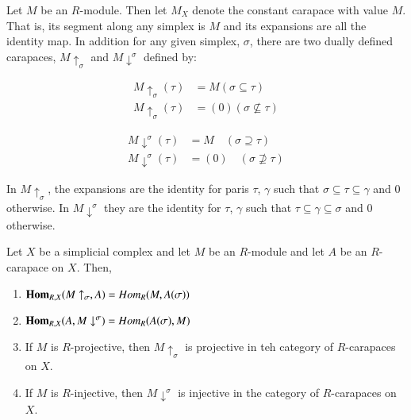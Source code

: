 Let $M$ be an $R$-module. Then let $M_{X}$ denote the constant carapace with value $M$. That is, its segment along any simplex is $M$ and its expansions are all the identity map. In addition for any given simplex, $\sigma$, there are two dually defined carapaces, $M \uparrow_{\sigma}$ and $M \downarrow^{\sigma}$ defined by:

\begin{equation*}
\begin{aligned}\label{chap6-eq-1.2}
M \uparrow_{\sigma} (\tau) &= M(\sigma \subseteq \tau)\\
M \uparrow_{\sigma} (\tau) &= (0)(\sigma \nsubseteq \tau)
\end{aligned}\tag{1.2}
\end{equation*}

\begin{equation*}
\begin{aligned}\label{chap6-eq-1.3}
M \downarrow^{\sigma} (\tau) &= M\quad(\sigma \supseteq \tau)\\
M \downarrow^{\sigma} (\tau) &= (0)\quad(\sigma \nsupseteq \tau)
\end{aligned}\tag{1.3}
\end{equation*}\pageoriginale

 In $M \uparrow_{\sigma}$, the expansions are the identity for paris $\tau$, $\gamma$ such that $\sigma \subseteq \tau \subseteq \gamma$ and 0 otherwise. In $M \downarrow^{\sigma}$ they are the identity for $\tau$, $\gamma$ such that $\tau \subseteq \gamma \subseteq \sigma$ and 0 otherwise.

\setcounter{definition}{3}
\begin{seclem}\label{chap6-lemma-1.4}
Let $X$ be a simplicial complex and let $M$ be an $R$-module and let $A$ be an $R$-carapace on $X$. Then,
\begin{enumerate}[1.]
\item $\operatorname{\mathbf{Hom}}_{R, X}(M \uparrow_{\sigma}, A) = Hom_{R}(M, A(\sigma))$\label{chap6-enum-lemma1.4-(1)}
\item $\operatorname{\mathbf{Hom}}_{R, X}(A , M \downarrow^{\sigma}) = Hom_{R}( A(\sigma), M)$\label{chap6-enum-lemma1.4-(2)}
\item If $M$ is $R$-projective, then $M \uparrow_{\sigma}$ is projective in teh category of $R$-carapaces on $X$.\label{chap6-enum-lemma1.4-(3)}
\item If $M$ is $R$-injective, then $M \downarrow^{\sigma}$ is injective in the category of $R$-carapaces on $X$.\label{chap6-enum-lemma1.4-(4)}
\end{enumerate}
\end{seclem}

